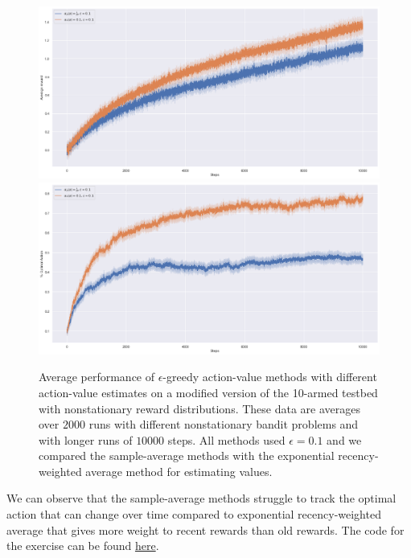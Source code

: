 \documentclass[10pt,a4paper]{article}
\begin{document}
\bigskip
\begin{figure}[h]
\centering
\includegraphics[width=\textwidth]{./non-stationary-testbed/images/avg_reward.png}
\includegraphics[width=\textwidth]{./non-stationary-testbed/images/percent_optimal_action.png}
\caption{Average performance of $\epsilon$-greedy action-value methods with different action-value estimates on a modified version of the 10-armed testbed with nonstationary reward distributions.
These data are averages over $2000$ runs with different nonstationary bandit problems and with longer runs of $10000$ steps. All methods used $\epsilon=0.1$ and we compared the sample-average methods with the exponential recency-weighted average method for estimating values.}
\end{figure}
We can observe that the sample-average methods struggle to track the optimal action that can change over time compared to exponential recency-weighted average that gives more weight to recent rewards than old rewards. The code for the exercise can be found \href{https://github.com/Zenchiyu/learning-rl/tree/develop/Intro_RL_Sutton_book/Chap2-Multi-Armed-Bandits/non-stationary-testbed#non-stationary-testbed}{here}.
\end{document}
